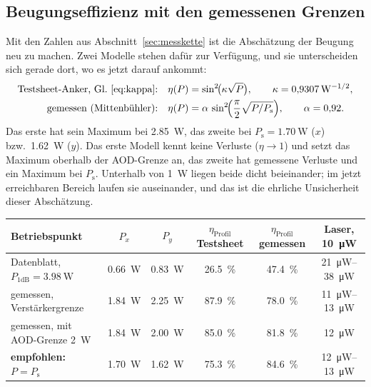 \documentclass[11pt,a4paper]{article}
\begin{document}
\subsection{Beugungseffizienz mit den gemessenen Grenzen}\label{sec:effmess}

Mit den Zahlen aus Abschnitt~\ref{sec:messkette} ist die Abschätzung der
Beugung neu zu machen. Zwei Modelle stehen dafür zur Verfügung, und sie
unterscheiden sich gerade dort, wo es jetzt darauf ankommt:
\begin{align}
  \text{Testsheet-Anker, Gl.~\eqref{eq:kappa}:}\quad
    &\eta(P) = \sin^2\!\bigl(\kappa\sqrt P\bigr),
    \qquad \kappa = 0{,}9307\,\si{\watt}^{-1/2},\\
  \text{gemessen (Mittenbühler):}\quad
    &\eta(P) = \alpha\,\sin^2\!\Bigl(\frac{\pi}{2}\sqrt{P/P_\mathrm{s}}\Bigr),
    \qquad \alpha = 0{,}92 .
\end{align}
Das erste hat sein Maximum bei \SI{2.85}{\watt}, das zweite bei
$P_\mathrm{s}=\SI{1.70}{\watt}$ ($x$) bzw.\ \SI{1.62}{\watt} ($y$).
Das erste Modell kennt keine Verluste ($\eta\to1$) und setzt das Maximum
oberhalb der AOD-Grenze an, das zweite hat gemessene Verluste und ein
Maximum bei $P_\mathrm{s}$. Unterhalb von \SI{1}{\watt} liegen beide dicht
beieinander; im jetzt erreichbaren Bereich laufen sie auseinander, und das
ist die ehrliche Unsicherheit dieser Abschätzung.

\begin{center}
\footnotesize
\begin{tabular}{@{}lccccc@{}}
  \toprule
  Betriebspunkt & $P_x$ & $P_y$ & $\eta_\mathrm{Profil}$ Testsheet &
  $\eta_\mathrm{Profil}$ gemessen & Laser, \SI{10}{\micro\watt}\\
  \midrule
  Datenblatt, $P_{1\mathrm{dB}}=\SI{3.98}{\watt}$
    & \SI{0.66}{\watt} & \SI{0.83}{\watt} & \SI{26.5}{\percent} & \SI{47.4}{\percent} & \SIrange{21}{38}{\micro\watt}\\
  gemessen, Verstärkergrenze
    & \SI{1.84}{\watt} & \SI{2.25}{\watt} & \SI{87.9}{\percent} & \SI{78.0}{\percent} & \SIrange{11}{13}{\micro\watt}\\
  gemessen, mit AOD-Grenze \SI{2}{\watt}
    & \SI{1.84}{\watt} & \SI{2.00}{\watt} & \SI{85.0}{\percent} & \SI{81.8}{\percent} & \SI{12}{\micro\watt}\\
  \textbf{empfohlen: $P=P_\mathrm{s}$}
    & \SI{1.70}{\watt} & \SI{1.62}{\watt} & \SI{75.3}{\percent} & \SI{84.6}{\percent} & \SIrange{12}{13}{\micro\watt}\\
  \bottomrule
\end{tabular}
\end{center}
\end{document}
